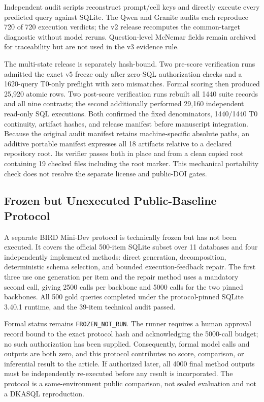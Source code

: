 \documentclass[applsci,article,submit,moreauthors]{Definitions/mdpi}
\begin{document}
Independent audit scripts reconstruct prompt/cell keys and directly execute every predicted query against SQLite. The Qwen and Granite audits each reproduce 720 of 720 execution verdicts; the v2 release recomputes the common-target diagnostic without model reruns. Question-level McNemar fields remain archived for traceability but are not used in the v3 evidence rule.

The multi-state release is separately hash-bound. Two pre-score verification runs admitted the exact v5 freeze only after zero-SQL authorization checks and a 1620-query T0-only preflight with zero mismatches. Formal scoring then produced 25,920 atomic rows. Two post-score verification runs rebuilt all 1440 suite records and all nine contrasts; the second additionally performed 29,160 independent read-only SQL executions. Both confirmed the fixed denominators, 1440/1440 T0 continuity, artifact hashes, and release manifest before manuscript integration. Because the original audit manifest retains machine-specific absolute paths, an additive portable manifest expresses all 18 artifacts relative to a declared repository root. Its verifier passes both in place and from a clean copied root containing 19 checked files including the root marker. This mechanical portability check does not resolve the separate license and public-DOI gates.

\subsection{Frozen but Unexecuted Public-Baseline Protocol}
A separate BIRD Mini-Dev protocol is technically frozen but has not been executed. It covers the official 500-item SQLite subset over 11 databases and four independently implemented methods: direct generation, decomposition, deterministic schema selection, and bounded execution-feedback repair. The first three use one generation per item and the repair method uses a mandatory second call, giving 2500 calls per backbone and 5000 calls for the two pinned backbones. All 500 gold queries completed under the protocol-pinned SQLite 3.40.1 runtime, and the 39-item technical audit passed.

Formal status remains \texttt{FROZEN\_NOT\_RUN}. The runner requires a human approval record bound to the exact protocol hash and acknowledging the 5000-call budget; no such authorization has been supplied. Consequently, formal model calls and outputs are both zero, and this protocol contributes no score, comparison, or inferential result to the article. If authorized later, all 4000 final method outputs must be independently re-executed before any result is incorporated. The protocol is a same-environment public comparison, not sealed evaluation and not a DKASQL reproduction.
\end{document}
